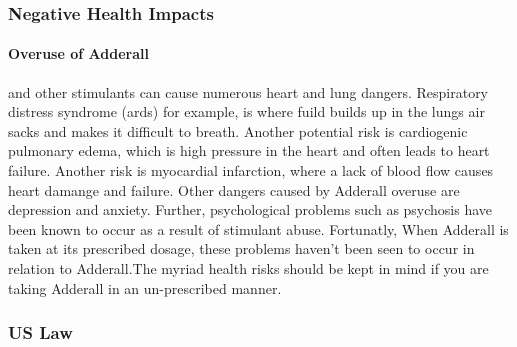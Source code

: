 \documentclass{article}
\begin{document}

            
            \subsubsection{Negative Health Impacts}
                \paragraph{Overuse of Adderall} and other stimulants can cause numerous heart and lung dangers. Respiratory distress syndrome (ards) for example, is where fuild builds up in the lungs air sacks and makes it difficult to breath. Another potential risk is cardiogenic pulmonary edema, which is high pressure in the heart and often leads to heart failure. Another risk is myocardial infarction, where a lack of blood flow causes heart damange and failure. Other dangers caused by Adderall overuse are depression and anxiety. Further, psychological problems such as psychosis\cite{lakhan12} have been known to occur as a result of stimulant abuse. Fortunatly, When Adderall is taken at its prescribed dosage, these problems haven't been seen to occur in relation to Adderall\cite{khan21}.The myriad health risks should be kept in mind if you are taking Adderall in an un-prescribed manner.
            \subsubsection{US Law}

\end{document}
